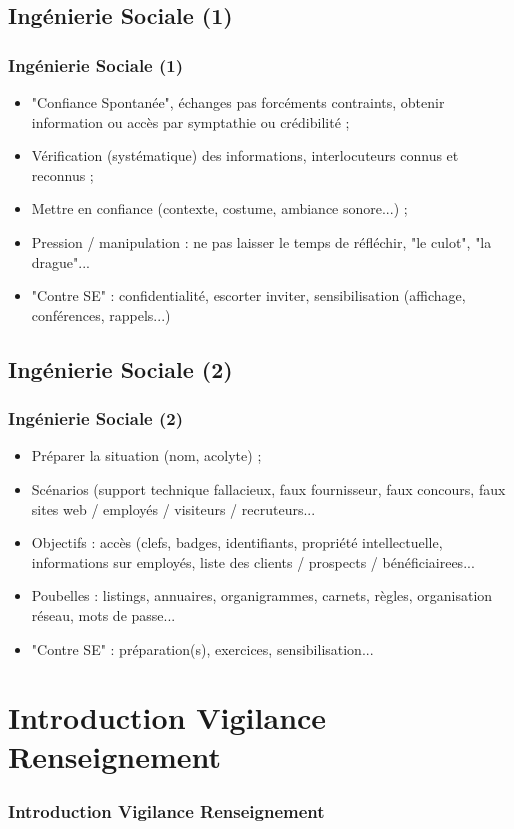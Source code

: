 \documentclass[slidetop,11pt]{beamer}
\begin{document}
\subsection{Ing{\'e}nierie Sociale (1)}
\begin{frame}
	\frametitle{Ing{\'e}nierie Sociale (1)}
	\begin{itemize}
		\item "Confiance Spontan{\'e}e", {\'e}changes pas forc{\'e}ments contraints, obtenir information ou acc{\`e}s par symptathie ou cr{\'e}dibilit{\'e} ; 
		\item V{\'e}rification (syst{\'e}matique) des informations, interlocuteurs connus et reconnus ; 
		\item Mettre en confiance (contexte, costume, ambiance sonore...) ; 
		\item Pression / manipulation : ne pas laisser le temps de r{\'e}fl{\'e}chir, "le culot", "la drague"...
		\item "Contre SE" : confidentialit{\'e}, escorter inviter, sensibilisation (affichage, conf{\'e}rences, rappels...)
	\end{itemize}
\end{frame}

\subsection{Ing{\'e}nierie Sociale (2)}
\begin{frame}
	\frametitle{Ing{\'e}nierie Sociale (2)}
	\begin{itemize}
		\item Pr{\'e}parer la situation (nom, acolyte) ; 
		\item Sc{\'e}narios (support technique fallacieux, faux fournisseur, faux concours, faux sites web / employ{\'e}s / visiteurs / recruteurs...
		\item Objectifs : acc{\`e}s (clefs, badges, identifiants, propri{\'e}t{\'e} intellectuelle, informations sur employ{\'e}s, liste des clients / prospects / b{\'e}n{\'e}ficiairees...
		\item Poubelles : listings, annuaires, organigrammes, carnets, r{\`e}gles, organisation r{\'e}seau, mots de passe...
		\item "Contre SE" : pr{\'e}paration(s), exercices, sensibilisation...
	\end{itemize}
\end{frame}

\section{Introduction Vigilance Renseignement}
\begin{frame}
	\frametitle{Introduction Vigilance Renseignement}
	\tableofcontents[sections=4,currentsection,subsectionstyle=show/shaded/hide] %
\end{frame}
\end{document}
